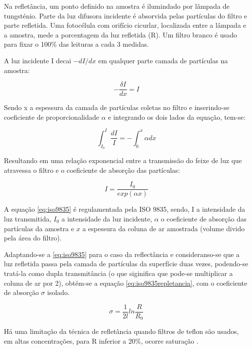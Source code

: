 Na refletância, um ponto definido na amostra é ilumindado por lâmpada de 
tungsténio. Parte da luz difusora incidente é absorvida pelas partículas
do filtro e parte refletida. Uma fotocélula com orifício cicurlar, localizada
entre a lâmpada e a amostra, mede a porcentagem da luz refletida (R).
Um filtro branco é usado para fixar o 100\% das leituras a cada 3 medidas.

A luz incidente I decai $-dI/dx$ em qualquer parte camada de partículas na 
amostra:

\begin{equation}
  -\frac{\delta I}{dx} = I
\end{equation}

Sendo x a espessura da camada de partículas coletas no filtro e inserindo-se
 coeficiente de proporcionalidade $\alpha$ e integrando os dois
lados da equação, tem-se:

\begin{equation}
  \int_{I_0}^{I} \frac{dI}{I} = - \int_{0}^{x} \alpha dx
\end{equation}

Resultando em uma relação exponencial entre a transmissão do feixe de luz 
que atravessa o filtro e o coeficiente de absorção das partículas:

\begin{equation}
  \label{eq:iso9835}
  I = \frac{I_0}{exp(\alpha x)}
\end{equation}

A equação \ref{eq:iso9835} é regulamentada pela ISO 9835, sendo, I a intensidade 
da luz transmitida, $I_0$ a intensidade da luz incidente, $\alpha$ o coeficiente
de absorção das partículas da amostra e $x$ a espessura da  coluna de ar amostrada 
(volume divido pela área do filtro).

Adaptando-se a \ref{eq:iso9835} para o caso da reflectância e consideranso-se 
que a luz refletida passa pela camada de partículas da superfície duas vezes, 
podendo-se tratá-la como dupla transmitância (o que siginifica que pode-se
multiplicar a coluna de ar por 2), obtém-se a equação 
\ref{eq:iso9835repletancia}, com o coeficiente de absorção $\sigma$
isolado.

\begin{equation}
  \label{eq:iso9835refletancia}
  \sigma = \frac{1}{2l} ln\frac{R}{R_0}
\end{equation}
 

Há uma limitação da técnica de refletância quando filtros de teflon são usados, 
em altas concentrações, para R inferior a 20\%, ocorre saturação \citep{taha2007}. 

